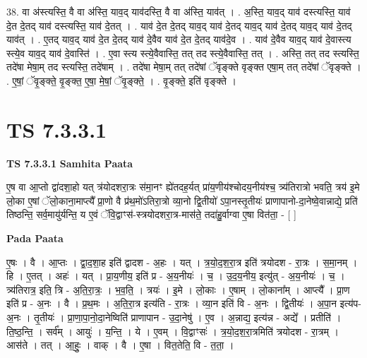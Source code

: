 \documentclass[17pt]{extarticle}
\begin{document}
38. वा अ॑स्त्यस्ति॒ वै वा अ॑स्ति॒ याव॒द् याव॑दस्ति॒ वै वा अ॑स्ति॒ याव॑त् । . अ॒स्ति॒ याव॒द् याव॑ दस्त्यस्ति॒ याव॑ दे॒त दे॒तद् याव॑ दस्त्यस्ति॒ याव॑ दे॒तत् । . याव॑ दे॒त दे॒तद् याव॒द् याव॑ दे॒तद् याव॒द् याव॑ दे॒तद् याव॒द् याव॑ दे॒तद् याव॑त् । . ए॒तद् याव॒द् याव॑ दे॒त दे॒तद् याव॑ दे॒वैव याव॑ दे॒त दे॒तद् याव॑दे॒व । . याव॑ दे॒वैव याव॒द् याव॑ दे॒वास्त्य स्त्ये॒व याव॒द् याव॑ दे॒वास्ति॑ । . ए॒वा स्त्य स्त्ये॒वैवास्ति॒ तत् तद स्त्ये॒वैवास्ति॒ तत् । . अस्ति॒ तत् तद स्त्यस्ति॒ तदे॑षा मेषा॒म् तद स्त्यस्ति॒ तदे॑षाम् । . तदे॑षा मेषा॒म् तत् तदे॑षां ॅवृङ्क्ते वृङ्क्त एषा॒म् तत् तदे॑षां ॅवृङ्क्ते । . ए॒षां॒ ॅवृ॒ङ्क्ते॒ वृ॒ङ्क्त॒ ए॒षा॒ मे॒षां॒ ॅवृ॒ङ्क्ते॒ । . वृ॒ङ्क्ते॒ इति॑ वृङ्क्ते । \newline
\pagebreak
{}

\section{ TS 7.3.3.1 }

\textbf{TS 7.3.3.1 } \newline
\textbf{Samhita Paata} \newline

ए॒ष वा आ॒प्तो द्वा॑दशा॒हो यत् त्र॑योदशरा॒त्रः स॑मा॒नꣳ ह्ये॑तदह॒र्यत् प्रा॑य॒णीय॑श्चोदय॒नीय॑श्च॒ त्र्य॑तिरात्रो भवति॒ त्रय॑ इ॒मे लो॒का ए॒षां ॅलो॒काना॒माप्त्यै᳚ प्रा॒णो वै प्र॑थ॒मो॑ऽतिरा॒त्रो व्या॒नो द्वि॒तीयो॑ ऽपा॒नस्तृ॒तीयः॑ प्राणापानो-दा॒नेष्वे॒वान्नाद्ये॒ प्रति॑ तिष्ठन्ति॒ सर्व॒मायु॑र्यन्ति॒ य ए॒वं ॅवि॒द्वाꣳस॑-स्त्रयोदशरा॒त्र-मास॑ते॒ तदा॑हु॒र्वाग्वा ए॒षा वित॑ता॒ - [  ] \newline

\textbf{Pada Paata} \newline

ए॒षः । वै । आ॒प्तः । द्वा॒द॒शा॒ह इति॑ द्वादश - अ॒हः । यत् । त्र॒यो॒द॒श॒रा॒त्र इति॑ त्रयोदश - रा॒त्रः । स॒मा॒नम् । हि । ए॒तत् । अहः॑ । यत् । प्रा॒य॒णीय॒ इति॑ प्र - अ॒य॒नीयः॑ । च॒ । उ॒द॒य॒नीय॒ इत्यु॑त् - अ॒य॒नीयः॑ । च॒ । त्र्य॑तिरात्र॒ इति॒ त्रि - अ॒ति॒रा॒त्रः॒ । भ॒व॒ति॒ । त्रयः॑ । इ॒मे । लो॒काः । ए॒षाम् । लो॒काना᳚म् । आप्त्यै᳚ । प्रा॒ण इति॑ प्र - अ॒नः । वै । प्र॒थ॒मः । अ॒ति॒रा॒त्र इत्य॑ति - रा॒त्रः । व्या॒न इति॑ वि - अ॒नः । द्वि॒तीयः॑ । अ॒पा॒न इत्य॑प-अ॒नः । तृ॒तीयः॑ । प्रा॒णा॒पा॒नो॒दा॒नेष्विति॑ प्राणापान - उ॒दा॒नेषु॑ । ए॒व । अ॒न्नाद्य॒ इत्य॑न्न - अद्ये᳚ । प्रतीति॑ । ति॒ष्ठ॒न्ति॒ । सर्व᳚म् । आयुः॑ । य॒न्ति॒ । ये । ए॒वम् । वि॒द्वाꣳसः॑ । त्र॒यो॒द॒श॒रा॒त्रमिति॑ त्रयोदश - रा॒त्रम् । आस॑ते । तत् । आ॒हुः॒ । वाक् । वै । ए॒षा । वित॒तेति॒ वि - त॒ता॒ ।  \newline
\end{document}
